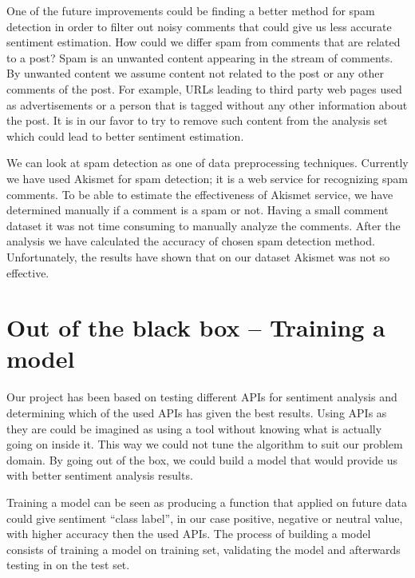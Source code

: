 One of the future improvements could be finding a better method for spam detection in order to filter out noisy comments that could give us less accurate sentiment estimation.  How could we differ spam from comments that are related to a post? Spam is an unwanted content appearing in the stream of comments. By unwanted content we assume content not related to the post or any other comments of the post. For example, URLs leading to third party web pages used as advertisements or a person that is tagged without any other information about the post. It is in our favor to try to remove such content from the analysis set which could lead to better sentiment estimation. 

We can look at spam detection as one of data preprocessing techniques. Currently we have used Akismet for spam detection; it is a web service for recognizing spam comments. To be able to estimate the effectiveness of Akismet service, we have determined manually if a comment is a spam or not. Having a small comment dataset it was not time consuming to manually analyze the comments. After the analysis we have calculated the accuracy of chosen spam detection method. Unfortunately, the results have shown that on our dataset Akismet was not so effective.

\section{Out of the black box – Training a model}

Our project has been based on testing different APIs for sentiment analysis and determining which of the used APIs has given the best results. Using APIs as they are could be imagined as using a tool without knowing what is actually going on inside it. This way we could not tune the algorithm to suit our problem domain. By going out of the box, we could build a model that would provide us with better sentiment analysis results. 

Training a model can be seen as producing a function that applied on future data could give sentiment “class label”, in our case positive, negative or neutral value, with higher accuracy then the used APIs. The process of building a model consists of training a model on training set, validating the model and afterwards testing in on the test set. 
